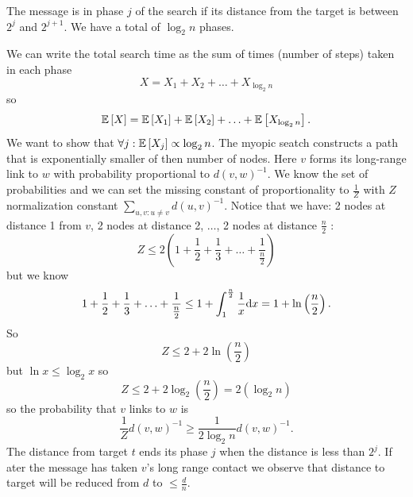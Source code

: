\documentclass[a4paper,9pt]{extarticle}
\begin{document}
\begin{multicols*}{2}
\begin{figure}[H]
			\label{fig:screenshot006}
		\end{figure}
	\begin{riquadro}
		The message is in phase $j$ of the search if its distance from the target is between $2^{j}$ and $2^{j+1}$. We have a total of $\log_{2}n$ phases.
	\end{riquadro}
	We can write the total search time as the sum of times (number of steps) taken in each phase
	\begin{equation*}
		X=X_{1}+X_{2}+\ldots+X_{\log_{2}n}
	\end{equation*}
	so
	\begin{equation*}
		\mathbb{E}\left[X\right]=\mathbb{E}\left[X_{1}\right]+\mathbb{E}\left[X_{2}\right]+\ldots+\mathbb{E}\left[X_{\log_{2}n}\right].
	\end{equation*}
	We want to show that $\forall j:\mathbb{E}\left[X_{j}\right]\propto\log_{2}n$. The myopic seatch constructs a path that is exponentially smaller of then number of nodes. Here $v$ forms its long-range link to $w$ with probability proportional to $d(v,w)^{-1}$. We know the set of probabilities and we can set the missing constant of proportionality to $\frac{1}{Z}$ with $Z$ normalization constant $\sum_{u,v:u\neq v}d(u,v)^{-1}$. Notice that we have: 2 nodes at distance 1 from $v$, 2 nodes at distance 2, $\ldots$, 2 nodes
	at distance $\frac{n}{2}$
	:
	\begin{equation*}
		Z\leq2\left(1+\frac{1}{2}+\frac{1}{3}+\ldots+\frac{1}{\frac{n}{2}}\right)
	\end{equation*}
	but we know
	\begin{equation*}
		1+\frac{1}{2}+\frac{1}{3}+\ldots+\frac{1}{\frac{n}{2}}\leq 1+\int_{1}^{\frac{n}{2}}\frac{1}{x}\mathrm{d} x=1+\ln\left(\frac{n}{2}\right).
	\end{equation*}
	So
	\begin{equation*}
		Z\leq2+2\ln\left(\frac{n}{2}\right)
	\end{equation*}
	but $\ln x\leq\log_{2}x$ so
	\begin{equation*}
		Z\leq2+2\log_{2}\left(\frac{n}{2}\right)=2(\log_{2}n)
	\end{equation*}
	so the probability that $v$ links to $w$ is
	\begin{equation*}
		\frac{1}{Z}d(v,w)^{-1}\geq\frac{1}{2\log_{2}n}d(v,w)^{-1}.
	\end{equation*}
	The distance from target $t$ ends its phase $j$ when the distance is less than $2^{j}$. If ater the message has taken $v$'s long range contact we observe that distance to target will be reduced from $d$ to $\leq \frac{d}{n}$. 
	\begin{figure}[H]

\end{figure}
\end{multicols*}
\end{document}
